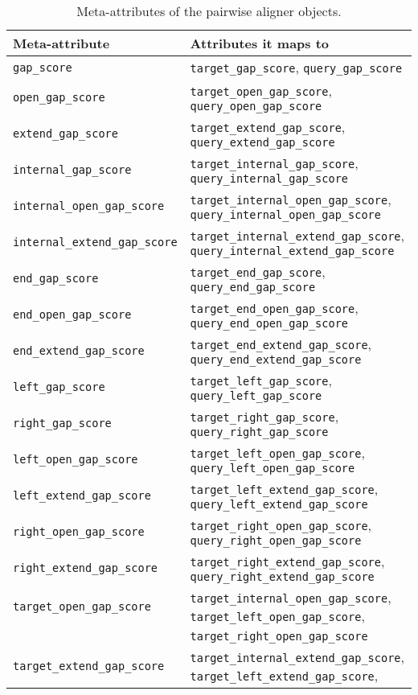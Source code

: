 \begin{table}
\caption{Meta-attributes of the pairwise aligner objects.}
\begin{tabular}{|l|l|}
\hline
\bf{Meta-attribute} & \bf{Attributes it maps to} \\
\hline
\verb+gap_score+ & \verb+target_gap_score+, \verb+query_gap_score+ \\
\verb+open_gap_score+ & \verb+target_open_gap_score+, \verb+query_open_gap_score+ \\
\verb+extend_gap_score+ & \verb+target_extend_gap_score+, \verb+query_extend_gap_score+ \\
\verb+internal_gap_score+ & \verb+target_internal_gap_score+, \verb+query_internal_gap_score+ \\
\verb+internal_open_gap_score+ & \verb+target_internal_open_gap_score+, \verb+query_internal_open_gap_score+ \\
\verb+internal_extend_gap_score+ & \verb+target_internal_extend_gap_score+, \verb+query_internal_extend_gap_score+ \\
\verb+end_gap_score+ & \verb+target_end_gap_score+, \verb+query_end_gap_score+ \\
\verb+end_open_gap_score+ & \verb+target_end_open_gap_score+, \verb+query_end_open_gap_score+ \\
\verb+end_extend_gap_score+ & \verb+target_end_extend_gap_score+, \verb+query_end_extend_gap_score+ \\
\verb+left_gap_score+ & \verb+target_left_gap_score+, \verb+query_left_gap_score+ \\
\verb+right_gap_score+ & \verb+target_right_gap_score+, \verb+query_right_gap_score+ \\
\verb+left_open_gap_score+ & \verb+target_left_open_gap_score+, \verb+query_left_open_gap_score+ \\
\verb+left_extend_gap_score+ & \verb+target_left_extend_gap_score+, \verb+query_left_extend_gap_score+ \\
\verb+right_open_gap_score+ & \verb+target_right_open_gap_score+, \verb+query_right_open_gap_score+ \\
\verb+right_extend_gap_score+ & \verb+target_right_extend_gap_score+, \verb+query_right_extend_gap_score+ \\
\verb+target_open_gap_score+ & \verb+target_internal_open_gap_score+, \verb+target_left_open_gap_score+, \\
                             & \verb+target_right_open_gap_score+ \\
\verb+target_extend_gap_score+ & \verb+target_internal_extend_gap_score+, \verb+target_left_extend_gap_score+, \\

\end{tabular}
\end{table}
